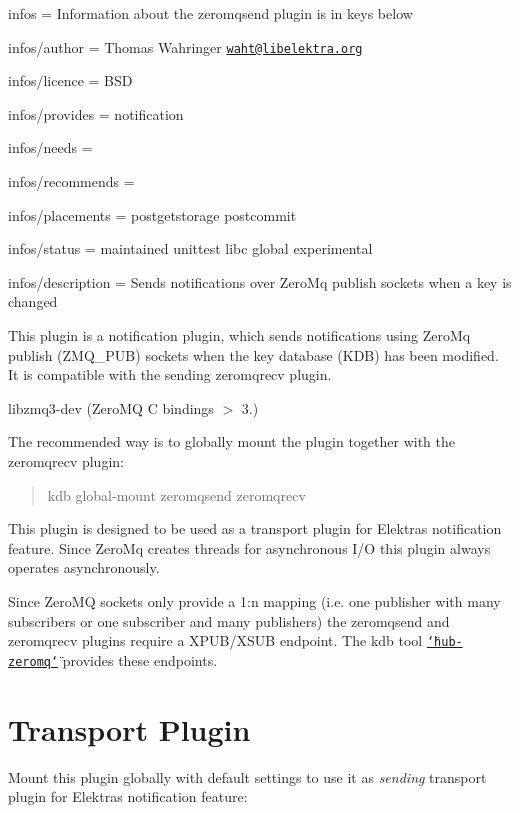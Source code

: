 
\begin{DoxyItemize}
\item infos = Information about the zeromqsend plugin is in keys below
\item infos/author = Thomas Wahringer \href{mailto:waht@libelektra.org}{\tt waht@libelektra.\+org}
\item infos/licence = B\+SD
\item infos/provides = notification
\item infos/needs =
\item infos/recommends =
\item infos/placements = postgetstorage postcommit
\item infos/status = maintained unittest libc global experimental
\item infos/description = Sends notifications over Zero\+Mq publish sockets when a key is changed
\end{DoxyItemize}

This plugin is a notification plugin, which sends notifications using Zero\+Mq publish ({\ttfamily Z\+M\+Q\+\_\+\+P\+UB}) sockets when the key database (K\+DB) has been modified. It is compatible with the sending zeromqrecv plugin.


\begin{DoxyItemize}
\item {\ttfamily libzmq3-\/dev} (Zero\+MQ C bindings $>$ 3.)
\end{DoxyItemize}

The recommended way is to globally mount the plugin together with the zeromqrecv plugin\+:

\begin{quote}
kdb global-\/mount zeromqsend zeromqrecv \end{quote}


This plugin is designed to be used as a transport plugin for Elektra\textquotesingle{}s notification feature. Since Zero\+Mq creates threads for asynchronous I/O this plugin always operates asynchronously.

Since Zero\+MQ sockets only provide a 1\+:n mapping (i.\+e. one publisher with many subscribers or one subscriber and many publishers) the {\ttfamily zeromqsend} and {\ttfamily zeromqrecv} plugins require a X\+P\+U\+B/\+X\+S\+UB endpoint. The kdb tool \href{https://www.libelektra.org/tools/hub-zeromq}{\tt \char`\"{}hub-\/zeromq\char`\"{}} provides these endpoints.\hypertarget{autotoc_md946_autotoc_md949}{}\section{Transport Plugin}\label{autotoc_md946_autotoc_md949}
Mount this plugin globally with default settings to use it as {\itshape sending} transport plugin for Elektra\textquotesingle{}s notification feature\+:

